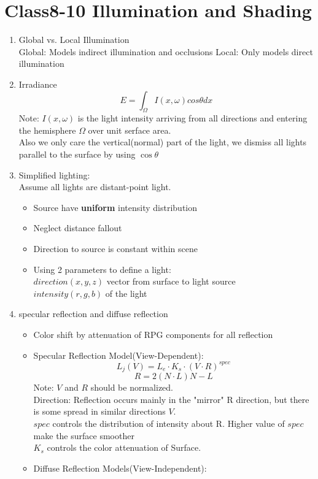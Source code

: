 \documentclass[geye,cyan,normal,en]{elegantnote}
\begin{document}
\section{Class8-10 Illumination and Shading}
\begin{enumerate}
	\item Global vs. Local Illumination\\
	Global: Models indirect illumination and occlusions
	Local: Only models direct illumination
	\item Irradiance
	$$E=\int_{\Omega} I(x,\omega) cos \theta dx$$
	Note: $I(x,\omega)$ is the light intensity arriving from all directions and entering the hemisphere $\Omega$ over unit serface area.\\
	Also we only care the vertical(normal) part of the light, we dismiss all lights parallel to the surface by using $\cos \theta$
	\item Simplified lighting:\\
	Assume all lights are distant-point light.
	\begin{itemize}
		\item Source have \textbf{uniform} intensity distribution
		\item Neglect distance fallout
		\item Direction to source is constant within scene
		\item Using 2 parameters to define a light:\\
		$direction(x,y,z)$ vector from surface to light source\\
		$intensity(r,g,b)$ of the light
	\end{itemize}
	\item specular reflection and diffuse reflection
	\begin{itemize}
		\item Color shift by attenuation of RPG components for all reflection
		\item Specular Reflection Model(View-Dependent):\\
		$$L_j(V) = L_e \cdot K_s \cdot (V\cdot R)^{spec}$$
		$$R=2(N\cdot L)N-L$$
		Note: $V$ and $R$ should be normalized.\\
		Direction: Reflection occurs mainly in the "mirror" R direction, but there is some spread in similar directions $V$.\\
		$spec$ controls the distribution of intensity about R. Higher value of $spec$ make the surface smoother\\
		$K_s$ controls the color attenuation of Surface.
		\item Diffuse Reflection Models(View-Independent):\\

\end{itemize}
\end{enumerate}
\end{document}
